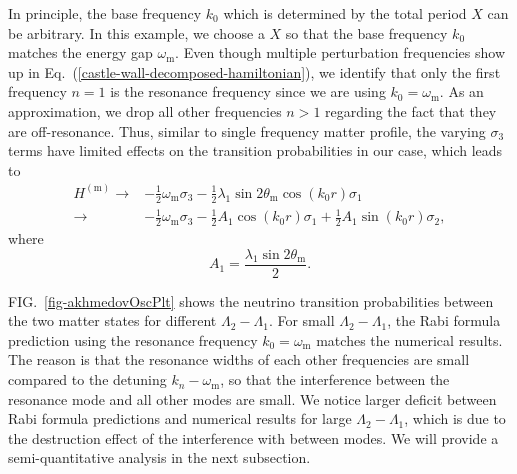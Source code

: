 \documentclass[%
reprint,
 amsmath,amssymb,
 aps,
]{revtex4-1}
\begin{document}
In principle, the base frequency $k_0$ which is determined by the total period $X$ can be arbitrary. In this example, we choose a $X$ so that the base frequency $k_0$ matches the energy gap $\omega_{\mathrm{m}}$. Even though multiple perturbation frequencies show up in Eq.~(\ref{castle-wall-decomposed-hamiltonian}), we identify that only the first frequency $n=1$ is the resonance frequency since we are using $k_0=\omega_{\mathrm{m}}$. As an approximation, we drop all other frequencies $n>1$ regarding the fact that they are off-resonance. Thus, similar to single frequency matter profile, the varying $\sigma_3$ terms have limited effects on the transition probabilities in our case, which leads to
\begin{align*}
    H^{(\mathrm m)} \to & - \frac{1}{2}\omega_{\mathrm m} \sigma_3  - \frac{1}{2} \lambda_1 \sin 2\theta_{\mathrm m}  \cos\left( k_0 r \right) \sigma_1\\
    \to & - \frac{1}{2}\omega_{\mathrm m} \sigma_3  - \frac{1}{2} A_1 \cos ( k_0 r) \sigma_1 + \frac{1}{2} A_1 \sin(k_0 r) \sigma_2,
\end{align*}
where
\begin{equation*}
A_1 = \frac{\lambda_1 \sin 2\theta_{\mathrm m} }{2} .
\end{equation*}


FIG.~\ref{fig-akhmedovOscPlt} shows the neutrino transition probabilities between the two matter states for different $\Lambda_2-\Lambda_1$. For small $\Lambda_2-\Lambda_1$, the Rabi formula prediction using the resonance frequency $k_0=\omega_{\mathrm m}$ matches the numerical results. The reason is that the resonance widths of each other frequencies are small compared to the detuning $k_n-\omega_{\mathrm m}$, so that the interference between the resonance mode and all other modes are small. We notice larger deficit between Rabi formula predictions and numerical results for large $\Lambda_2-\Lambda_1$, which is due to the destruction effect of the interference with between modes. We will provide a semi-quantitative analysis in the next subsection.
\end{document}
